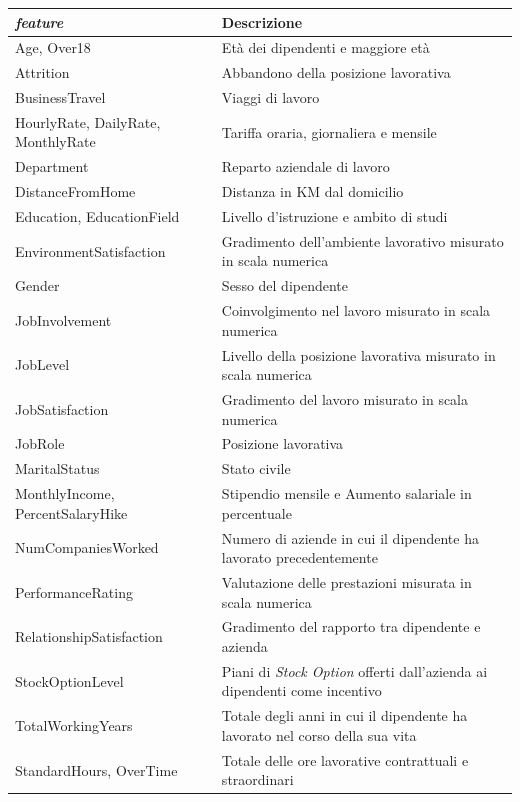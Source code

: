 \begin{table}
\centering
\large
\begin{tabular}{ |p{6.5cm}|p{8cm}|}
\hline
 \textbf{\textit{feature}} & \textbf{Descrizione} \\
 \hline
Age, Over18 & Età dei dipendenti e maggiore età \\
\hline
 Attrition & Abbandono della posizione lavorativa\\
\hline
BusinessTravel & Viaggi di lavoro\\
\hline
HourlyRate, DailyRate, MonthlyRate & Tariffa oraria, giornaliera e mensile\\
\hline
Department & Reparto aziendale di lavoro \\
\hline
DistanceFromHome& Distanza in KM dal domicilio\\
\hline
Education, EducationField & Livello d'istruzione e ambito di studi \\
\hline
EnvironmentSatisfaction& Gradimento dell'ambiente lavorativo misurato in scala numerica\\
\hline
Gender& Sesso del dipendente\\
\hline
JobInvolvement& Coinvolgimento nel lavoro misurato in scala numerica \\
\hline
JobLevel& Livello della posizione lavorativa misurato in scala numerica \\
\hline
JobSatisfaction& Gradimento del lavoro misurato in scala numerica\\
\hline
JobRole& Posizione lavorativa\\
\hline
MaritalStatus & Stato civile\\
\hline
MonthlyIncome, PercentSalaryHike& Stipendio mensile e Aumento salariale in percentuale \\
\hline
NumCompaniesWorked& Numero di aziende in cui il dipendente ha lavorato precedentemente\\
\hline
PerformanceRating& Valutazione delle prestazioni misurata in scala numerica\\
\hline
RelationshipSatisfaction& Gradimento del rapporto tra dipendente e azienda\\
\hline
StockOptionLevel& Piani di \textit{Stock Option} offerti dall'azienda ai dipendenti come incentivo \\
\hline
TotalWorkingYears& Totale degli anni in cui il dipendente ha lavorato nel corso della sua vita\\
\hline
StandardHours, OverTime& Totale delle ore lavorative contrattuali e straordinari\\

\end{tabular}
\end{table}
